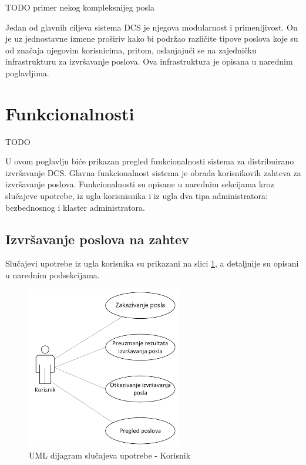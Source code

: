 \documentclass[12pt,oneside]{memoir}
\begin{document}
TODO primer nekog kompleksnijeg posla

Jedan od glavnih ciljeva sistema DCS je njegova modularnost i primenljivost. On je uz jednostavne izmene proširiv kako bi podržao različite tipove poslova koje su od značaja njegovim korisnicima, pritom, oslanjajući se na zajedničku infrastrukturu za izvršavanje poslova. Ova infrastruktura je opisana u narednim poglavljima.


\section{Funkcionalnosti}
\label{chp:opisfunkc}

TODO 

U ovom poglavlju biće prikazan pregled funkcionalnosti sistema za distribuirano izvršavanje DCS. 
Glavna funkcionalnost sistema je obrada korisnikovih zahteva za izvršavanje poslova. 
Funkcionalnosti su opisane u narednim sekcijama kroz slučajeve upotrebe, iz ugla korisnisnika i iz ugla dva tipa administratora: bezbednosnog i klaster administratora.

\subsection{Izvršavanje poslova na zahtev}
Slučajevi upotrebe iz ugla korisnika su prikazani na slici \ref{fig:slucajupotrebe_korisnik}, a detaljnije su opisani u narednim podsekcijama.

\begin{figure}[!ht]
  \centering
  \includegraphics[width=0.6\textwidth]{./images/dijagram_slucajeva_upotrebe_korisnik.png}
  \caption{UML dijagram slučajeva upotrebe - Korisnik}
  \label{fig:slucajupotrebe_korisnik}
\end{figure}
\end{document}
